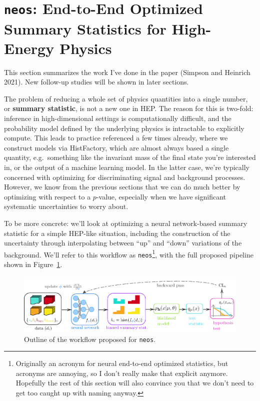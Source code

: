 \documentclass[
  11pt,
  numbers=noendperiod]{book}
\begin{document}
\hypertarget{sec-neos}{%
\section{\texorpdfstring{\texttt{neos}: End-to-End Optimized Summary
Statistics for High-Energy
Physics}{neos: End-to-End Optimized Summary Statistics for High-Energy Physics}}\label{sec-neos}}

This section summarizes the work I've done in the paper (Simpson and
Heinrich 2021). New follow-up studies will be shown in later sections.

The problem of reducing a whole set of physics quantities into a single
number, or \textbf{summary statistic}, is not a new one in HEP. The
reason for this is two-fold: inference in high-dimensional settings is
computationally difficult, and the probability model defined by the
underlying physics is intractable to explicitly compute. This leads to
practice referenced a few times already, where we construct models via
HistFactory, which are almost always based a single quantity,
e.g.~something like the invariant mass of the final state you're
interested in, or the output of a machine learning model. In the latter
case, we're typically concerned with optimizing for discriminating
signal and background processes. However, we know from the previous
sections that we can do much better by optimizing with respect to a
\(p\)-value, especially when we have significant systematic
uncertainties to worry about.

To be more concrete: we'll look at optimizing a neural network-based
summary statistic for a simple HEP-like situation, including the
construction of the uncertainty through interpolating between ``up'' and
``down'' variations of the background. We'll refer to this workflow as
\texttt{neos}\footnote{Originally an acronym for neural end-to-end
  optimized statistics, but acronyms are annoying, so I don't really
  make that explicit anymore. Hopefully the rest of this section will
  also convince you that we don't need to get too caught up with naming
  anyway.}, with the full proposed pipeline shown in
Figure~\ref{fig-neos}.

\begin{figure}

{\centering \includegraphics{./images/neos.pdf}

}

\caption{\label{fig-neos}Outline of the workflow proposed for
\texttt{neos}.}

\end{figure}
\end{document}

